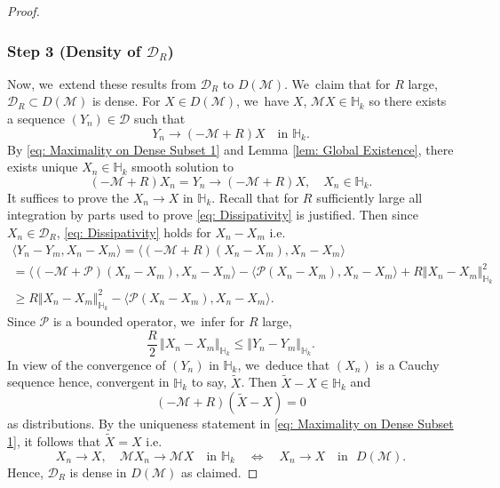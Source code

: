 \documentclass[10pt]{article}
\newcommand{\ie}{i.e.}
\theoremstyle{plain}
\theoremstyle{definition}
\begin{document}
\begin{proof}
\subsubsection*{Step 3 (Density of $\mathcal D_R$)}
Now, we~extend these results from $\mathcal D_R$ to $D(\mathcal M)$. We~claim that for $R$ large, $\mathcal D_R\subset D(\mathcal M)$ is dense. For $X\in D(\mathcal M)$, we~have $X$, $\mathcal MX\in\mathbb H_k$ so there exists a sequence $(Y_n)\in \mathcal D$ such that
\[
Y_n\to (-\mathcal M+R)X\quad\text{in }\mathbb H_k.
\]
By \eqref{eq: Maximality on Dense Subset 1} and Lemma \ref{lem: Global Existence}, there exists unique $X_n\in\mathbb H_k$ smooth solution to
\[
(-\mathcal M+R)X_n=Y_n\to (-\mathcal M+R)X,\quad X_n\in \mathbb H_k.
\]
It suffices to prove the $X_n\to X$ in $\mathbb H_k$. Recall that for $R$ sufficiently large all integration by parts used to prove \eqref{eq: Dissipativity} is justified. Then since $X_n\in \mathcal D_R$, \eqref{eq: Dissipativity} holds for $X_n-X_m$ \ie\vspace*{-5pt}
\begin{multline*}
\langle Y_n-Y_m, X_n-X_m\rangle = \langle (-\mathcal M+R)(X_n-X_m), X_n-X_m\rangle \\
= \langle (-\mathcal M+\mathcal P)(X_n-X_m), X_n-X_m\rangle - \langle \mathcal P(X_n-X_m), X_n-X_m\rangle +R\Vert X_n-X_m\Vert _{\mathbb H_k}^2\\
\ge R\Vert X_n-X_m\Vert _{\mathbb H_k}^2 - \langle \mathcal P(X_n-X_m), X_n-X_m\rangle.
\end{multline*}
Since $\mathcal P$ is a bounded operator, we~infer for $R$ large,\vspace*{-3pt}
\[
\frac{R}{2}\,\Vert X_n-X_m\Vert_{\mathbb H_k}\le \Vert Y_n-Y_m\Vert_{\mathbb H_k}.
\]
In view of the convergence of $(Y_n)$ in $\mathbb H_k$, we~deduce that $(X_n)$ is a Cauchy sequence hence, convergent in $\mathbb H_k$ to say, $\tilde X$. Then $\tilde X-X\in\mathbb H_k$ and\vspace*{-3pt}
\[
(-\mathcal M+R)(\tilde X-X)=0
\]
as distributions. By the uniqueness statement in \eqref{eq: Maximality on Dense Subset 1}, it follows that $\tilde X=X$ \ie
\[
X_n\to X,\quad \mathcal MX_n\to\mathcal MX \quad\text{in }\mathbb H_k\quad \iff \quad X_n\to X\quad\text{in }\,\,D(\mathcal M).
\]
Hence, $\mathcal D_R$ is dense in $D(\mathcal M)$ as claimed.


\end{proof}
\end{document}
